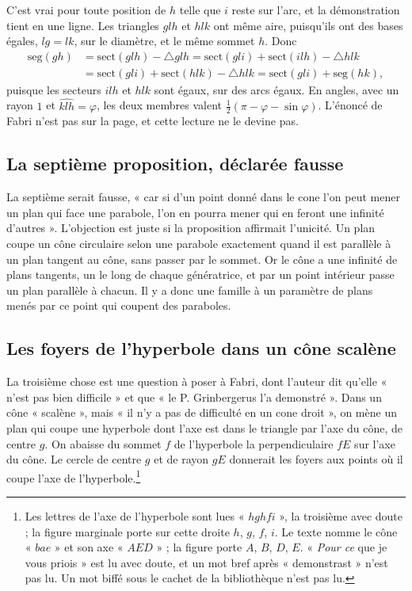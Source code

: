 \documentclass[11pt,a4paper]{article}
\begin{document}
C'est vrai pour toute position de \(h\) telle que \(i\) reste sur l'arc, et la
démonstration tient en une ligne. Les triangles \(glh\) et \(hlk\) ont même aire,
puisqu'ils ont des bases égales, \(lg=lk\), sur le diamètre, et le même sommet
\(h\). Donc
\begin{align*}
\text{seg}(gh)&=\text{sect}(glh)-\triangle glh
=\text{sect}(gli)+\text{sect}(ilh)-\triangle hlk\\
&=\text{sect}(gli)+\text{sect}(hlk)-\triangle hlk
=\text{sect}(gli)+\text{seg}(hk),
\end{align*}
puisque les secteurs \(ilh\) et \(hlk\) sont égaux, sur des arcs égaux. En
angles, avec un rayon \(1\) et \(\widehat{klh}=\varphi\), les deux membres
valent \(\tfrac12(\pi-\varphi-\sin\varphi)\). L'énoncé de Fabri n'est pas sur
la page, et cette lecture ne le devine pas.

\subsection*{La septième proposition, déclarée fausse}

La septième serait fausse, « car si d'un point donné dans le cone l'on peut
mener un plan qui face une parabole, l'on en pourra mener qui en feront une
infinité d'autres ». L'objection est juste si la proposition affirmait
l'unicité. Un plan coupe un cône circulaire selon une parabole exactement
quand il est parallèle à un plan tangent au cône, sans passer par le sommet. Or
le cône a une infinité de plans tangents, un le long de chaque génératrice, et
par un point intérieur passe un plan parallèle à chacun. Il y a donc une
famille à un paramètre de plans menés par ce point qui coupent des paraboles.

\subsection*{Les foyers de l'hyperbole dans un cône scalène}

La troisième chose est une question à poser à Fabri, dont l'auteur dit qu'elle
« n'est pas bien difficile » et que « le P. Grinbergerus l'a demonstré ». Dans
un cône « scalène », mais « il n'y a pas de difficulté en un cone droit », on
mène un plan qui coupe une hyperbole dont l'axe est dans le triangle par l'axe
du cône, de centre \(g\). On abaisse du sommet \(f\) de l'hyperbole la
perpendiculaire \(fE\) sur l'axe du cône. Le cercle de centre \(g\) et de rayon
\(gE\) donnerait les foyers aux points où il coupe l'axe de
l'hyperbole.\footnote{Les lettres de l'axe de l'hyperbole sont lues
« \(hghfi\) », la troisième avec doute ; la figure marginale porte sur cette
droite \(h\), \(g\), \(f\), \(i\). Le texte nomme le cône « \(bae\) » et son axe
« \(AED\) » ; la figure porte \(A\), \(B\), \(D\), \(E\). « \emph{Pour ce} que
je vous priois » est lu avec doute, et un mot bref après « demonstrast » n'est
pas lu. Un mot biffé sous le cachet de la bibliothèque n'est pas lu.}
\end{document}
